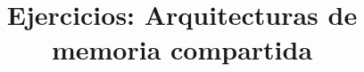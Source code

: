 

\title{Ejercicios: Arquitecturas de memoria compartida}



\maketitle

\pagestyle{fancyplain}





